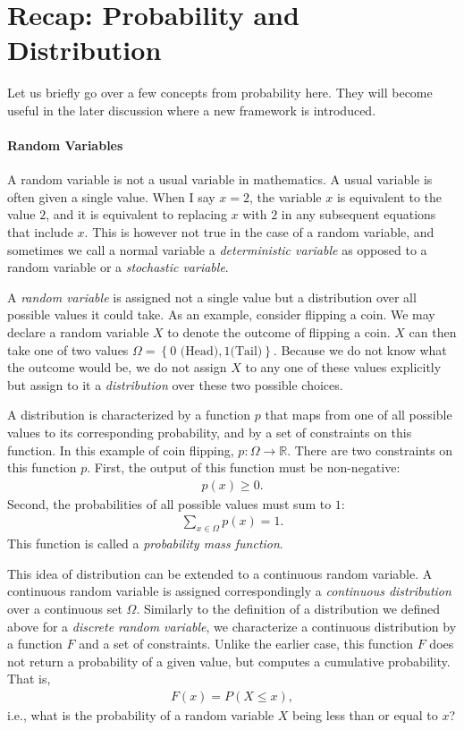 \documentclass{report}
\newcommand{\RR}[0]{\mathbb{R}}
\begin{document}
\section{Recap: Probability and Distribution}

Let us briefly go over a few concepts from probability here. They will become
useful in the later discussion where a new framework is introduced. 

\paragraph{Random Variables}

A random variable is not a usual variable in mathematics. A usual variable is
often given a single value. When I say $x=2$, the variable $x$ is equivalent to
the value $2$, and it is equivalent to replacing $x$ with $2$ in any subsequent
equations that include $x$. This is however not true in the case of a random
variable, and sometimes we call a normal variable a {\it deterministic variable}
as opposed to a random variable or a {\it stochastic variable}.

A {\it random variable} is assigned not a single value but a distribution over
all possible values it could take. As an example, consider flipping a coin. We
may declare a random variable $X$ to denote the outcome of flipping a coin. $X$
can then take one of two values $\Omega = \left\{0\text{ (Head)}, 1\text{
(Tail)}\right\}$.  Because we do not know what the outcome would be, we do not
assign $X$ to any one of these values explicitly but assign to it a {\it
distribution} over these two possible choices. 

A distribution is characterized by a function $p$ that maps from one of all
possible values to its corresponding probability, and by a set of constraints on
this function. In this example of coin flipping, $p: \Omega \to \RR$. There are
two constraints on this function $p$. First, the output of this function must be
non-negative:
\begin{align*}
    p(x) \geq 0.
\end{align*}
Second, the probabilities of all possible values must sum to $1$:
\begin{align*}
    \sum_{x \in \Omega} p(x) = 1.
\end{align*}
This function is called a {\it probability mass function}. 

This idea of distribution can be extended to a continuous random variable. A
continuous random variable is assigned correspondingly a {\it continuous
distribution} over a continuous set $\Omega$. Similarly to the definition of a
distribution we defined above for a {\it discrete random variable}, we
characterize a continuous distribution by a function $F$ and a set of
constraints.  Unlike the earlier case, this function $F$ does not return a
probability of a given value, but computes a cumulative probability. That is,
\begin{align}
    \label{eq:cdf}
    F(x) = P(X \leq x),
\end{align}
i.e., what is the probability of a random variable $X$ being less than or equal
to $x$? 
\end{document}
